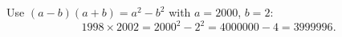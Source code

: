 Use $(a-b)(a+b)=a^2-b^2$ with $a=2000$, $b=2$:
\[
1998\times2002=2000^2-2^2=4000000-4=\boxed{3999996}.
\]
